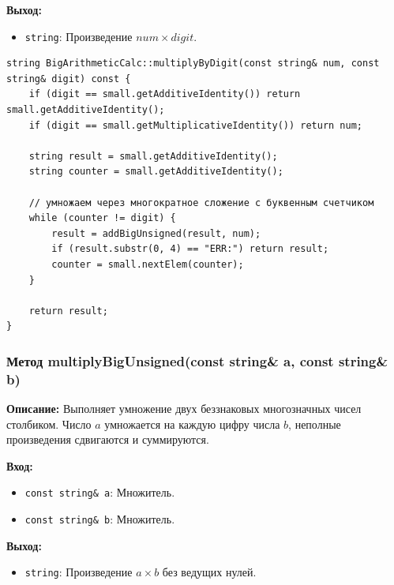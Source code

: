 \textbf{Выход: }
\begin{itemize}
    \item \texttt{string}: Произведение $num \times digit$. 
\end{itemize}

\begin{lstlisting}[style=cstyle, caption={Реализация multiplyByDigit()}]
string BigArithmeticCalc::multiplyByDigit(const string& num, const string& digit) const {
    if (digit == small.getAdditiveIdentity()) return small.getAdditiveIdentity();
    if (digit == small.getMultiplicativeIdentity()) return num;
    
    string result = small.getAdditiveIdentity();
    string counter = small.getAdditiveIdentity();
    
    // умножаем через многократное сложение с буквенным счетчиком
    while (counter != digit) {
        result = addBigUnsigned(result, num);
        if (result.substr(0, 4) == "ERR:") return result;
        counter = small.nextElem(counter);
    }
    
    return result;
}
\end{lstlisting}


\subsubsection{Метод multiplyBigUnsigned(const string\& a, const string\& b)}

\textbf{Описание:} Выполняет умножение двух беззнаковых многозначных чисел столбиком.  Число $a$ умножается на каждую цифру числа $b$, неполные произведения сдвигаются и суммируются.

\textbf{Вход:}
\begin{itemize}
    \item \texttt{const string\& a}: Множитель.
    \item \texttt{const string\& b}: Множитель.
\end{itemize}

\textbf{Выход:}
\begin{itemize}
    \item \texttt{string}: Произведение $a \times b$ без ведущих нулей.
\end{itemize}


